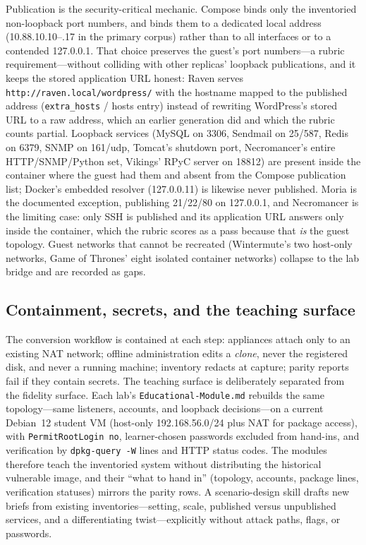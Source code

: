 \documentclass[3p,twocolumn,authoryear]{elsarticle}
\begin{document}
Publication is the security-critical mechanic. Compose binds only the
inventoried non-loopback port numbers, and binds them to a dedicated
local address (10.88.10.10--.17 in the primary corpus) rather than to
all interfaces or to a contended 127.0.0.1. That choice preserves the
guest's port numbers---a rubric requirement---without colliding with
other replicas' loopback publications, and it keeps the stored
application URL honest: Raven serves
\texttt{http://raven.local/wordpress/} with the hostname mapped to the
published address (\texttt{extra\_hosts} / hosts entry) instead of
rewriting WordPress's stored URL to a raw address, which an earlier
generation did and which the rubric counts partial. Loopback services
(MySQL on 3306, Sendmail on 25/587, Redis on 6379, SNMP on 161/udp,
Tomcat's shutdown port, Necromancer's entire HTTP/SNMP/Python set,
Vikings' RPyC server on 18812) are present inside the container where
the guest had them and absent from the Compose publication list;
Docker's embedded resolver (127.0.0.11) is likewise never published.
Moria is the documented exception, publishing 21/22/80 on 127.0.0.1,
and Necromancer is the limiting case: only SSH is published and its
application URL answers only inside the container, which the rubric
scores as a pass because that \emph{is} the guest topology. Guest
networks that cannot be recreated (Wintermute's two host-only
networks, Game of Thrones' eight isolated container networks) collapse
to the lab bridge and are recorded as gaps.

\subsection{Containment, secrets, and the teaching surface}

The conversion workflow is contained at each step: appliances attach
only to an existing NAT network; offline administration edits a
\emph{clone}, never the registered disk, and never a running machine;
inventory redacts at capture; parity reports fail if they contain
secrets. The teaching surface is deliberately separated from the
fidelity surface. Each lab's \texttt{Educational-Module.md} rebuilds
the same topology---same listeners, accounts, and loopback
decisions---on a current Debian~12 student VM (host-only
192.168.56.0/24 plus NAT for package access), with
\texttt{PermitRootLogin no}, learner-chosen passwords excluded from
hand-ins, and verification by \texttt{dpkg-query -W} lines and HTTP
status codes. The modules therefore teach the inventoried system
without distributing the historical vulnerable image, and their
``what to hand in'' (topology, accounts, package lines, verification
statuses) mirrors the parity rows. A scenario-design skill drafts new
briefs from existing inventories---setting, scale, published versus
unpublished services, and a differentiating twist---explicitly without
attack paths, flags, or passwords.
\end{document}
